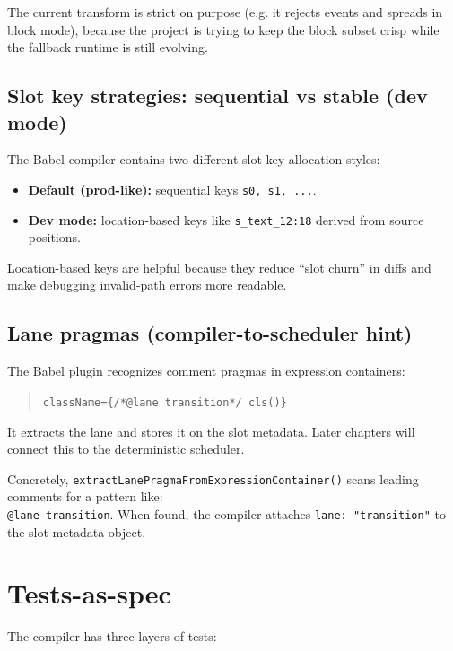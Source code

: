 The current transform is strict on purpose (e.g. it rejects events and spreads in block mode), because the project is trying to keep the block subset crisp while the fallback runtime is still evolving.

\subsection{Slot key strategies: sequential vs stable (dev mode)}

The Babel compiler contains two different slot key allocation styles:

\begin{itemize}
\item \textbf{Default (prod-like):} sequential keys \texttt{s0, s1, ...}.
\item \textbf{Dev mode:} location-based keys like \texttt{s\_text\_12:18} derived from source positions.
\end{itemize}

Location-based keys are helpful because they reduce ``slot churn'' in diffs and make debugging invalid-path errors more readable.

\subsection{Lane pragmas (compiler-to-scheduler hint)}

The Babel plugin recognizes comment pragmas in expression containers:

\begin{quote}
\texttt{className=\{/*@lane transition*/ cls()\}}
\end{quote}

It extracts the lane and stores it on the slot metadata.
Later chapters will connect this to the deterministic scheduler.

Concretely, \texttt{extractLanePragmaFromExpressionContainer()} scans leading comments for a pattern like:\\
	\texttt{@lane transition}.
When found, the compiler attaches \texttt{lane: "transition"} to the slot metadata object.

\section{Tests-as-spec}

The compiler has three layers of tests:

